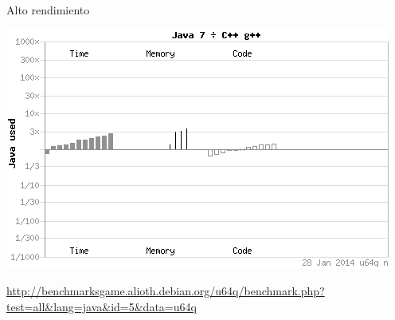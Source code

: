 \begin{frame}[t]{Alto rendimiento}
\begin{center}
\includegraphics[width=.7\textwidth]{images/java-cpp-performance.png}

{\tiny\url{http://benchmarksgame.alioth.debian.org/u64q/benchmark.php?test=all&lang=java&id=5&data=u64q}}
\end{center}
\end{frame}
